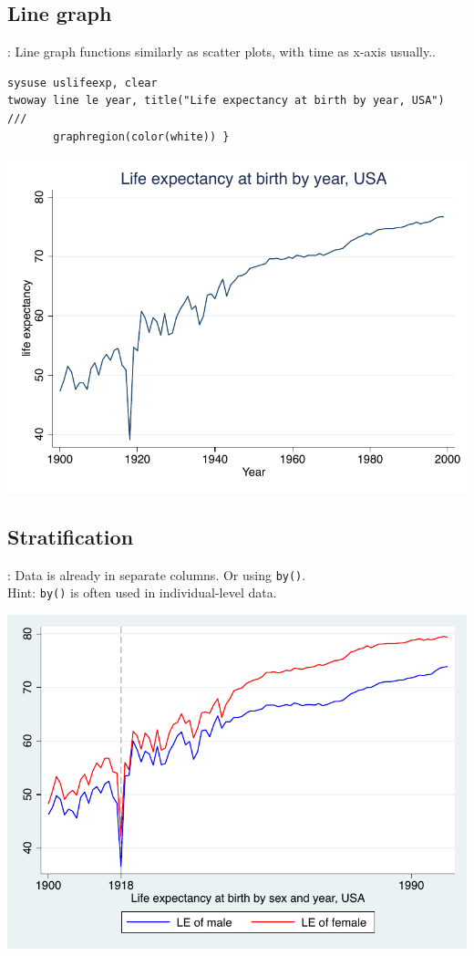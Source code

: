 \subsection{Line graph}
\begin{frame}[fragile]{\secname: \subsecname}
Line graph functions similarly as scatter plots, with time as x-axis usually..
\small
\begin{verbatim}
sysuse uslifeexp, clear
twoway line le year, title("Life expectancy at birth by year, USA") ///
       graphregion(color(white)) }
\end{verbatim}
\begin{center}
	\includegraphics[scale=0.5]{images/line}
\end{center}
\end{frame}


\subsection{Stratification}
\begin{frame}[fragile]{\secname: \subsecname}
Data is already in separate columns. Or using \verb|by()|. \\
Hint: \verb|by()| is often used in individual-level data.
\begin{center}
	\includegraphics[scale=0.5]{images/stratification}
\end{center}

\end{frame}
